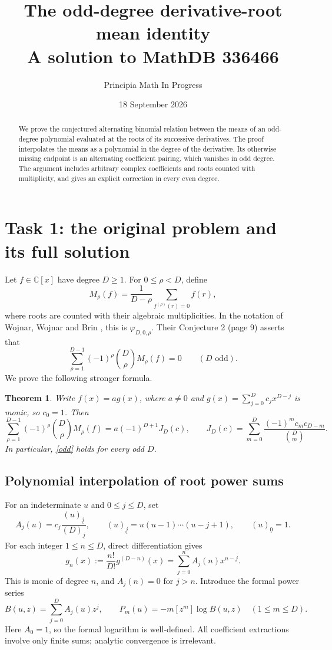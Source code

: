 \documentclass[11pt]{article}
\title{The odd-degree derivative-root mean identity\\
\large A solution to MathDB 336466}
\author{Principia Math In Progress}
\date{18 September 2026}
\newtheorem{theorem}{Theorem}
\newcommand{\fall}[2]{(#1)_{\underline{#2}}}
\begin{document}
\maketitle
\begin{abstract}
We prove the conjectured alternating binomial relation between the
means of an odd-degree polynomial evaluated at the roots of its
successive derivatives. The proof interpolates the means as a
polynomial in the degree of the derivative. Its otherwise missing
endpoint is an alternating coefficient pairing, which vanishes in
odd degree. The argument includes arbitrary complex coefficients
and roots counted with multiplicity, and gives an explicit
correction in every even degree.
\end{abstract}

\section*{Task 1: the original problem and its full solution}
Let $f\in\mathbb C[x]$ have degree $D\geq1$. For $0\leq\rho<D$,
define
\[
 M_\rho(f)=\frac1{D-\rho}\sum_{f^{(\rho)}(r)=0}f(r),
\]
where roots are counted with their algebraic multiplicities.
In the notation of Wojnar, Wojnar and Brin \cite{W}, this is
$\varphi_{D,0,\rho}$. Their Conjecture 2 (page 9) asserts that
\begin{equation}\label{odd}
 \sum_{\rho=1}^{D-1}(-1)^\rho\binom D\rho M_\rho(f)=0
 \qquad(D\text{ odd}).
\end{equation}
We prove the following stronger formula.

\begin{theorem}\label{main}
Write $f(x)=a g(x)$, where $a\ne0$ and
$g(x)=\sum_{j=0}^D c_jx^{D-j}$ is monic, so $c_0=1$. Then
\begin{equation}\label{general}
 \sum_{\rho=1}^{D-1}(-1)^\rho\binom D\rho M_\rho(f)
 =a(-1)^{D+1}J_D(c),\qquad
 J_D(c)=\sum_{m=0}^D\frac{(-1)^m c_m c_{D-m}}{\binom Dm}.
\end{equation}
In particular, \eqref{odd} holds for every odd $D$.
\end{theorem}

\subsection*{Polynomial interpolation of root power sums}
For an indeterminate $u$ and $0\leq j\leq D$, set
\[
 A_j(u)=c_j\frac{\fall uj}{\fall Dj},\qquad
 \fall uj=u(u-1)\cdots(u-j+1),\qquad \fall u0=1.
\]
For each integer $1\leq n\leq D$, direct differentiation gives
\begin{equation}\label{derivative}
 g_n(x):=\frac{n!}{D!}g^{(D-n)}(x)
       =\sum_{j=0}^n A_j(n)x^{n-j}.
\end{equation}
This is monic of degree $n$, and $A_j(n)=0$ for $j>n$.
Introduce the formal power series
\[
 B(u,z)=\sum_{j=0}^D A_j(u)z^j,\qquad
 P_m(u)=-m[z^m]\log B(u,z)\quad(1\leq m\leq D).
\]
Here $A_0=1$, so the formal logarithm is well-defined. All
coefficient extractions involve only finite sums; analytic
convergence is irrelevant.
\end{document}

